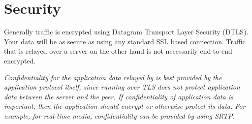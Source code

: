 \section{Security}
Generally  traffic is encrypted using Datagram Transport Layer Security (DTLS). Your data will be as secure as using any standard SSL based connection. Traffic that is relayed over a  server on the other hand is not necessarily end-to-end encrypted.

\textit{Confidentiality for the application data relayed by  is best provided by the application protocol itself, since running  over TLS does not protect application data between the server and the peer. If confidentiality of application data is important, then the application should encrypt or otherwise protect its data. For example, for real-time media, confidentiality can be provided by using SRTP.}~\cite{TURN:sec}